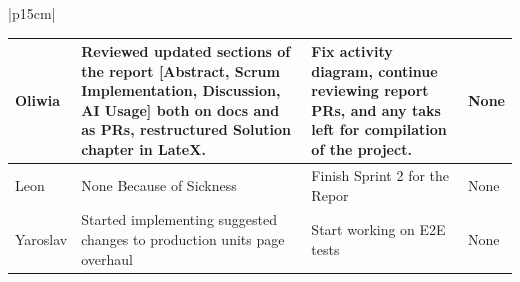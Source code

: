 \begin{table}[H]
    \centering
    \begin{tabular}{|p{15cm}|} 
        \hline
        \begin{table}[H]
            \begin{tabular}{|p{1.75cm}|p{4cm}|p{4cm}|p{4cm}|}
                \hline
                \cellcolor[HTML]{d4d4d4} Oliwia & Reviewed updated sections of the report [Abstract, Scrum Implementation, Discussion, AI Usage] both on docs and as PRs, restructured Solution chapter in LateX. & Fix activity diagram, continue reviewing report PRs, and any taks left for compilation of the project. & None \\
                \hline
                \cellcolor[HTML]{d4d4d4} Leon & None Because of Sickness & Finish Sprint 2 for the Repor & None \\
                \hline
                \cellcolor[HTML]{d4d4d4} Yaroslav & Started implementing suggested changes to production units page overhaul & Start working on E2E tests & None \\
                \hline
            \end{tabular}
        \end{table}
        \\
        \hline
    \end{tabular}
\end{table}


